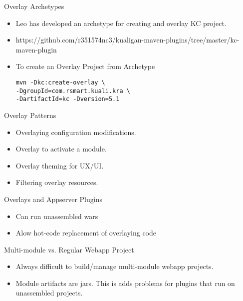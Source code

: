 \documentclass[xcolor=dvipsnames,14pt]{beamer}
\begin{document}
\begin{frame}[fragile]{Overlay Archetypes}
  \begin{itemize}
  \item Leo has developed an archetype for creating and overlay KC project.
  \item https://github.com/r351574nc3/kualigan-maven-plugins/tree/master/kc-maven-plugin
  \item To create an Overlay Project from Archetype
  \begin{verbatim}
mvn -Dkc:create-overlay \
-DgroupId=com.rsmart.kuali.kra \
-DartifactId=kc -Dversion=5.1
  \end{verbatim}
  \end{itemize}
\end{frame}

\begin{frame}{Overlay Patterns}
  \begin{itemize}
    \item Overlaying configuration modifications.
    \item Overlay to activate a module.
    \item Overlay theming for UX/UI.
    \item Filtering overlay resources.
  \end{itemize}
\end{frame}

\begin{frame}[fragile]{Overlays and Appserver Plugins}
\begin{itemize}
\item Can run unassembled wars
\item Alow hot-code replacement of overlaying code
\end{itemize}
\end{frame}

\begin{frame}{Multi-module vs. Regular Webapp Project}
  \begin{itemize}
    \item Always difficult to build/manage multi-module webapp
      projects.
    \item Module artifacts are jars. This is adds problems for plugins that run on unassembled projects.
  \end{itemize}
\end{frame}
\end{document}
